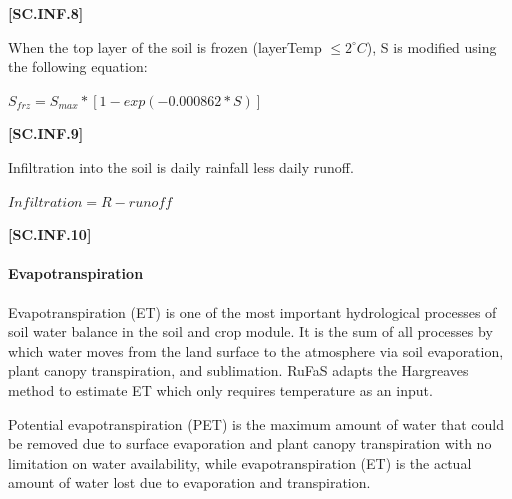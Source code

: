             {\raggedleft \textbf{[SC.INF.8]}\par}
            \vspace{0.5cm}

When the top layer of the soil is frozen (layerTemp \(\leq 2^\circ C\)), S is modified using the following equation: 
            \vspace{0.5cm}
            

    \begin{center}
 \( S_{frz}=S_{max} * [1-exp(-0.000862 * S )]\)
    \end{center}
        \vspace{0.5cm} 
    
            {\raggedleft \textbf{[SC.INF.9]}\par}
            \vspace{0.5cm}
            
Infiltration into the soil is daily rainfall less daily runoff.
            \vspace{0.5cm}
            

    \begin{center}
 \( Infiltration=R-runoff\)
    \end{center}
        \vspace{0.5cm} 
    
            {\raggedleft \textbf{[SC.INF.10]}\par}
            \vspace{0.5cm}


\paragraph{Evapotranspiration}
\vspace{-0.25cm}

Evapotranspiration (ET) is one of the most important hydrological processes of soil water balance in the soil and crop module. It is the sum of all processes by which water moves from the land surface to the atmosphere via soil evaporation, plant canopy transpiration, and sublimation. RuFaS adapts the Hargreaves method \parencite{hargreaves1985} to estimate ET which only requires temperature as an input.
\vspace{0.2cm}

Potential evapotranspiration (PET) is the maximum amount of water that could be removed due to surface evaporation and plant canopy transpiration with no limitation on water availability, while evapotranspiration (ET) is the actual amount of water lost due to evaporation and transpiration. 
\vspace{0.5cm}

